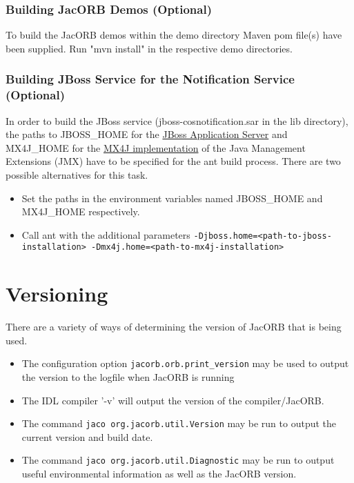 \subsubsection{Building JacORB Demos (Optional)}
To build the JacORB demos within the demo directory Maven pom file(s) have been supplied. Run "mvn install" in the respective demo directories.

\subsubsection{Building JBoss Service for the Notification Service (Optional)}
In order to build the JBoss service (jboss-cosnotification.sar in the lib
directory), the paths to JBOSS\_HOME for the
\href{http://www.jboss.org/jbossas}{JBoss Application Server} and MX4J\_HOME
for the \href{http://mx4j.sourceforge.net}{MX4J implementation}
 of the Java Management Extensions (JMX) have to be specified for the ant build
process. There are two possible alternatives for this task.
\begin{itemize}
\item Set the paths in the environment variables named JBOSS\_HOME and MX4J\_HOME respectively.
\item Call ant with the additional parameters {\tt -Djboss.home=<path-to-jboss-installation> -Dmx4j.home=<path-to-mx4j-installation>}
\end{itemize}


\section{Versioning}
There are a variety of ways of determining the version of JacORB that is being used.
\begin{itemize}
\item The configuration option {\tt jacorb.orb.print\_version} may be used to output the version to the logfile when JacORB is running
\item The IDL compiler '-v' will output the version of the compiler/JacORB.
\item The command {\tt jaco org.jacorb.util.Version} may be run to output the current version and build date.
\item The command {\tt jaco org.jacorb.util.Diagnostic} may be run to output useful environmental information as well as the JacORB version.
\end{itemize}

